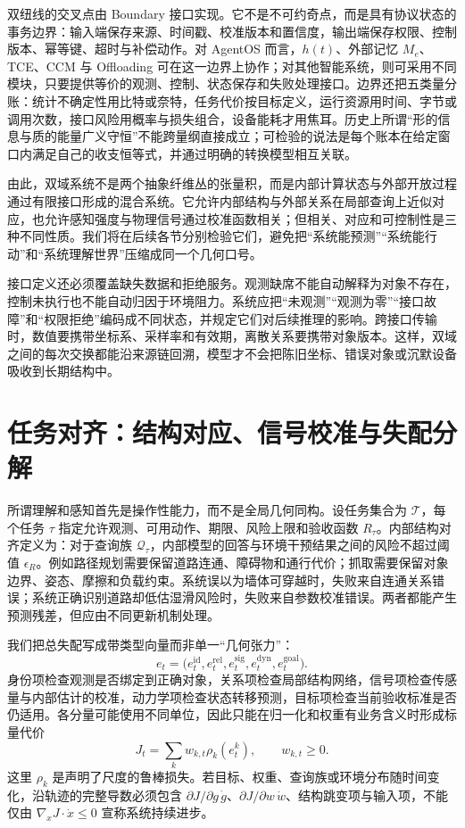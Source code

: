 双纽线的交叉点由 Boundary 接口实现。它不是不可约奇点，而是具有协议状态的事务边界：输入端保存来源、时间戳、校准版本和置信度，输出端保存权限、控制版本、幂等键、超时与补偿动作。对 AgentOS 而言，$h(t)$、外部记忆 $M_e$、TCE、CCM 与 Offloading 可在这一边界上协作；对其他智能系统，则可采用不同模块，只要提供等价的观测、控制、状态保存和失败处理接口。边界还把五类量分账：统计不确定性用比特或奈特，任务代价按目标定义，运行资源用时间、字节或调用次数，接口风险用概率与损失组合，设备能耗才用焦耳。历史上所谓“形的信息与质的能量广义守恒”不能跨量纲直接成立；可检验的说法是每个账本在给定窗口内满足自己的收支恒等式，并通过明确的转换模型相互关联。

由此，双域系统不是两个抽象纤维丛的张量积，而是内部计算状态与外部开放过程通过有限接口形成的混合系统。它允许内部结构与外部关系在局部查询上近似对应，也允许感知强度与物理信号通过校准函数相关；但相关、对应和可控制性是三种不同性质。我们将在后续各节分别检验它们，避免把“系统能预测”“系统能行动”和“系统理解世界”压缩成同一个几何口号。

接口定义还必须覆盖缺失数据和拒绝服务。观测缺席不能自动解释为对象不存在，控制未执行也不能自动归因于环境阻力。系统应把“未观测”“观测为零”“接口故障”和“权限拒绝”编码成不同状态，并规定它们对后续推理的影响。跨接口传输时，数值要携带坐标系、采样率和有效期，离散关系要携带对象版本。这样，双域之间的每次交换都能沿来源链回溯，模型才不会把陈旧坐标、错误对象或沉默设备吸收到长期结构中。

\section{任务对齐：结构对应、信号校准与失配分解}
\label{sec:section_3582}

所谓理解和感知首先是操作性能力，而不是全局几何同构。设任务集合为 $\mathcal{T}$，每个任务 $\tau$ 指定允许观测、可用动作、期限、风险上限和验收函数 $R_\tau$。内部结构对齐定义为：对于查询族 $\mathcal{Q}_\tau$，内部模型的回答与环境干预结果之间的风险不超过阈值 $\epsilon_R$。例如路径规划需要保留道路连通、障碍物和通行代价；抓取需要保留对象边界、姿态、摩擦和负载约束。系统误以为墙体可穿越时，失败来自连通关系错误；系统正确识别道路却低估湿滑风险时，失败来自参数校准错误。两者都能产生预测残差，但应由不同更新机制处理。

我们把总失配写成带类型向量而非单一“几何张力”：
\[
e_t=\bigl(e_t^{\mathrm{id}},e_t^{\mathrm{rel}},e_t^{\mathrm{sig}},e_t^{\mathrm{dyn}},e_t^{\mathrm{goal}}\bigr).
\]
身份项检查观测是否绑定到正确对象，关系项检查局部结构网络，信号项检查传感量与内部估计的校准，动力学项检查状态转移预测，目标项检查当前验收标准是否仍适用。各分量可能使用不同单位，因此只能在归一化和权重有业务含义时形成标量代价
\[
J_t=\sum_k w_{k,t}\rho_k(e_t^k),\qquad w_{k,t}\ge 0.
\]
这里 $\rho_k$ 是声明了尺度的鲁棒损失。若目标、权重、查询族或环境分布随时间变化，沿轨迹的完整导数必须包含 $\partial J/\partial g\,\dot g$、$\partial J/\partial w\,\dot w$、结构跳变项与输入项，不能仅由 $\nabla_xJ\cdot\dot x\le0$ 宣称系统持续进步。

